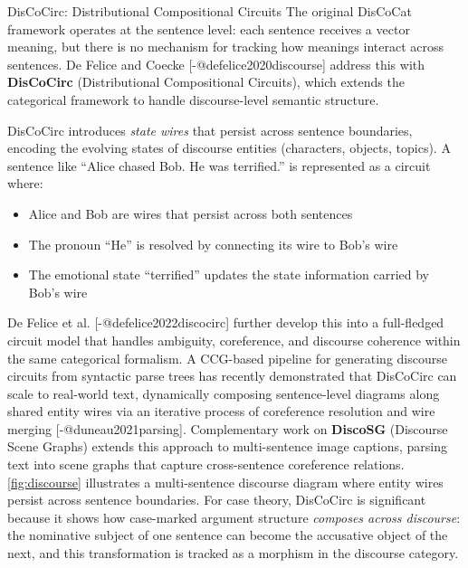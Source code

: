 \documentclass[
  ignorenonframetext,
]{beamer}
\providecommand{\tightlist}{%
  \setlength{\itemsep}{0pt}\setlength{\parskip}{0pt}}
\begin{document}
\begin{frame}{DisCoCirc: Distributional Compositional Circuits}
\protect{}\label{discocirc-distributional-compositional-circuits}
The original DisCoCat framework operates at the sentence level: each
sentence receives a vector meaning, but there is no mechanism for
tracking how meanings interact across sentences. De Felice and Coecke
{[}-@defelice2020discourse{]} address this with \textbf{DisCoCirc}
(Distributional Compositional Circuits), which extends the categorical
framework to handle discourse-level semantic structure.

DisCoCirc introduces \emph{state wires} that persist across sentence
boundaries, encoding the evolving states of discourse entities
(characters, objects, topics). A sentence like ``Alice chased Bob. He
was terrified.'' is represented as a circuit where:

\begin{itemize}
\tightlist
\item
  Alice and Bob are wires that persist across both sentences
\item
  The pronoun ``He'' is resolved by connecting its wire to Bob's wire
\item
  The emotional state ``terrified'' updates the state information
  carried by Bob's wire
\end{itemize}

De Felice et al. {[}-@defelice2022discocirc{]} further develop this into
a full-fledged circuit model that handles ambiguity, coreference, and
discourse coherence within the same categorical formalism. A CCG-based
pipeline for generating discourse circuits from syntactic parse trees
has recently demonstrated that DisCoCirc can scale to real-world text,
dynamically composing sentence-level diagrams along shared entity wires
via an iterative process of coreference resolution and wire merging
{[}-@duneau2021parsing{]}. Complementary work on \textbf{DiscoSG}
(Discourse Scene Graphs) extends this approach to multi-sentence image
captions, parsing text into scene graphs that capture cross-sentence
coreference relations. \autoref{fig:discourse} illustrates a
multi-sentence discourse diagram where entity wires persist across
sentence boundaries. For case theory, DisCoCirc is significant because
it shows how case-marked argument structure \emph{composes across
discourse}: the nominative subject of one sentence can become the
accusative object of the next, and this transformation is tracked as a
morphism in the discourse category.


\end{frame}
\end{document}
